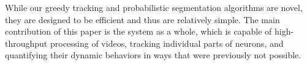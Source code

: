While  our greedy tracking  and probabilistic  segmentation algorithms
are  novel,  they are designed to be efficient and thus are relatively 
simple.  The  main contribution of this  paper is the  system as a
whole,  which  is capable  of  high-throughput  processing of  videos,
tracking individual  parts of  neurons, and quantifying  their dynamic
behaviors in ways that were previously not possible.













